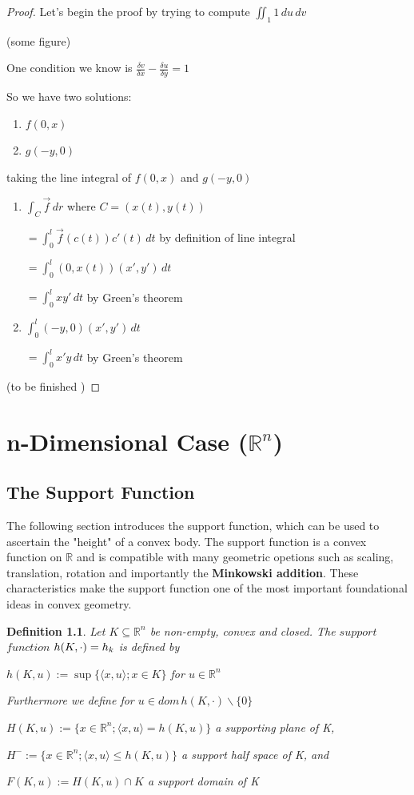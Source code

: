 \documentclass[a4paper]{book}
\newtheorem{definition}{Definition}%
\begin{document}
\begin{proof}
	Let's begin the proof by trying to compute $\iint_{1} 1 \,du\,dv$

	(some figure)

	One condition we know is $\frac{\delta v}{\delta x}-\frac{\delta u}{\delta y}=1$
	
	So we have two solutions:
	\begin{enumerate}
		\item $f(0,x)$
		\item $g(-y,0)$
	\end{enumerate}
	
	taking the line integral of $f(0,x)$ and $g(-y,0)$
	\begin{enumerate}
		\item
			$\int_{C} \overrightarrow{f} \,dr$ \;\;\;where\; $C=(x(t),y(t))$
				
			$= \int_{0}^{l} \overrightarrow{f}(c(t))c'(t) \,dt$ \;\;\;by definition of line integral

			$= \int_{0}^{l} (0,x(t))(x',y') \,dt$
			
			$= \int_{0}^{l} xy' \,dt$ \;\;\;by Green's theorem
		\item
			$\int_{0}^{l} (-y,0)(x',y') \,dt$
			
			$= \int_{0}^{l} x'y \,dt$ \;\;\;by Green's theorem
	\end{enumerate}
	
	(to be finished )
\end{proof}

\chapter{n-Dimensional Case ($\mathbb{R}^n$)}
\section{The Support Function}
The following section introduces the support function, which can be used to ascertain the "height" of a convex body. The support function is a convex function on $\mathbb{R}$ and is compatible with many geometric opetions such as scaling, translation, rotation and importantly the \textbf{Minkowski addition}. These characteristics make the support function one of the most important foundational ideas in convex geometry.

\begin{definition}
	Let $K\subseteq\mathbb{R}^n$ be non-empty, convex and closed. The $support$ $function$ $h(K,\cdot\space)=h_k$ is defined by
	\begin{center}
		$h(K,u):=\sup\{\langle x,u\rangle;x\in K\}$ for $u\in\mathbb{R}^n$
	\end{center}
	Furthermore we define for $u\in dom\,h(K,\cdot)\backslash\{0\}$
	\begin{center}
		$H(K,u):=\{x\in\mathbb{R}^n;\langle x,u\rangle=h(K,u)\}$ a supporting plane of K,
		
		$H^{-}:=\{x\in\mathbb{R}^n;\langle x,u\rangle\leq h(K,u)\}$ a support half space of K, and 
		
		$F(K,u):=H(K,u)\cap K$ a support domain of K
	\end{center}
\end{definition}
\end{document}
